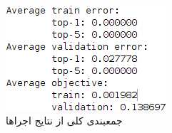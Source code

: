 \documentclass[10pt,a4paper]{article}
\newcommand{\نیمفاصله}{\halfspace}
\renewcommand{\ }{\halfspace}
\newcommand{\renderref}[1] { \begingroup \let\clearpage\relax  \endgroup }
\newcommand{\مق}{\lr}
\begin{document}
\begin{figure}
\centering
\includegraphics[width=.4\textwidth]{../sec_C/results/texts.png}
\caption{جمع\ بندی کلی از نتایج اجراها}
\end{figure}

\renderref{reference}
\end{document}
